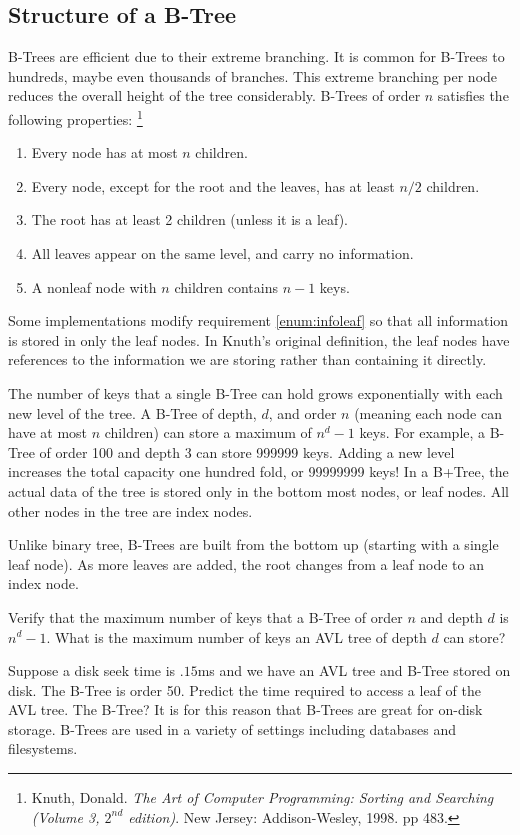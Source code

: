 \subsection*{Structure of a B-Tree}
B-Trees are efficient due to their extreme branching.  It is common for B-Trees to hundreds, maybe even thousands of branches.
This extreme branching per node reduces the overall height of the tree considerably.
B-Trees of order $n$ satisfies the following properties:
\footnote{Knuth, Donald. \emph{The Art of Computer Programming: Sorting and Searching (Volume 3, $2^{nd}$ edition)}. New Jersey: Addison-Wesley, 1998. pp 483.}
\begin{enumerate}
\item Every node has at most $n$ children.
\item Every node, except for the root and the leaves, has at least $n/2$ children.
\item The root has at least 2 children (unless it is a leaf).
\item \label{enum:infoleaf} All leaves appear on the same level, and carry no information.
\item A nonleaf node with $n$ children contains $n-1$ keys.
\end{enumerate}
Some implementations modify requirement \ref{enum:infoleaf} so that all information is stored in only the leaf nodes.  In Knuth's original definition, the leaf nodes have references to the information we are storing rather than containing it directly.

The number of keys that a single B-Tree can hold grows exponentially with each new level of the tree.  A B-Tree of depth, $d$, and order $n$ (meaning each node can have at most $n$ children) can store a maximum of $n^{d} - 1$ keys.  For example, a B-Tree of order 100 and depth 3 can store 999999 keys.  Adding a new level increases the total capacity one hundred fold, or 99999999 keys!
In a B+Tree, the actual data of the tree is stored only in the bottom most nodes, or leaf nodes.  All other nodes in the tree are index nodes.

Unlike binary tree, B-Trees are built from the bottom up (starting with a single leaf node).  As more leaves are added, the root changes from a leaf node to an index node.  

\begin{problem}
Verify that the maximum number of keys that a B-Tree of order $n$ and depth $d$ is $n^{d}-1$.
What is the maximum number of keys an AVL tree of depth $d$ can store?

Suppose a disk seek time is $.15$ms and we have an AVL tree and B-Tree stored on disk.  The B-Tree is order 50.
Predict the time required to access a leaf of the AVL tree.  The B-Tree?
It is for this reason that B-Trees are great for on-disk storage.  B-Trees are used in a variety of settings including databases and filesystems.
\end{problem}

